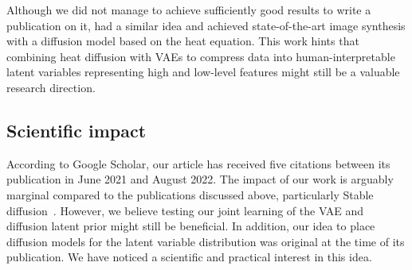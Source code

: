 Although we did not manage to achieve sufficiently good results to write a publication on it, \citet{rissanen2022generative} had a similar idea and achieved state-of-the-art image synthesis with a diffusion model based on the heat equation. This work hints that combining heat diffusion with VAEs to compress data into human-interpretable latent variables representing high and low-level features might still be a valuable research direction.

\subsection{Scientific impact}

According to Google Scholar, our article has received five citations between its publication in June 2021 and August 2022.
The impact of our work is arguably marginal compared to the publications discussed above, particularly Stable diffusion~\citep{rombach2022high}. However, we believe testing our joint learning of the VAE and diffusion latent prior might still be beneficial. In addition, our idea to place diffusion models for the latent variable distribution was original at the time of its publication. We have noticed a scientific and practical interest in this idea.

